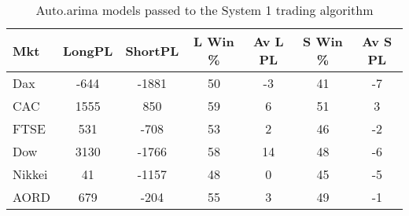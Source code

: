 \begin{table}[ht]
\centering
\caption[Sysytem 1 and auto.arima models]{Auto.arima models passed to the System 1 trading algorithm} 
\label{tab:chp_ts:arima1}
\begin{tabular}{lcccccc}
  \toprule Mkt & LongPL & ShortPL & L Win \% & Av L PL & S Win \% & Av S PL \\ 
  \midrule Dax & -644 & -1881 & 50 & -3 & 41 & -7 \\ 
  CAC & 1555 & 850 & 59 & 6 & 51 & 3 \\ 
  FTSE & 531 & -708 & 53 & 2 & 46 & -2 \\ 
  Dow & 3130 & -1766 & 58 & 14 & 48 & -6 \\ 
  Nikkei & 41 & -1157 & 48 & 0 & 45 & -5 \\ 
  AORD & 679 & -204 & 55 & 3 & 49 & -1 \\ 
   \bottomrule \end{tabular}
\end{table}
